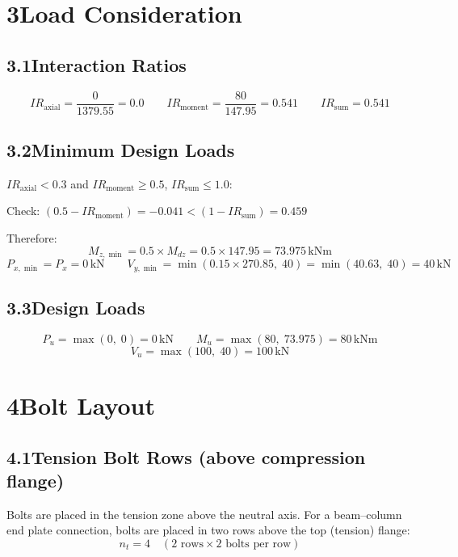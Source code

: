 \documentclass[12pt,a4paper]{article}
\newcommand{\kN}{\,\text{kN}}
\newcommand{\kNm}{\,\text{kNm}}
\begin{document}
\section{3\quad Load Consideration}

\subsection{3.1\quad Interaction Ratios}
\[
  IR_{\text{axial}}  = \frac{0}{1379.55} = 0.0
  \qquad
  IR_{\text{moment}} = \frac{80}{147.95} = 0.541
  \qquad
  IR_{\text{sum}} = 0.541
\]

\subsection{3.2\quad Minimum Design Loads}
$IR_{\text{axial}} < 0.3$ and $IR_{\text{moment}} \geq 0.5$, $IR_{\text{sum}} \leq 1.0$:

Check: $(0.5 - IR_{\text{moment}}) = -0.041 < (1 - IR_{\text{sum}}) = 0.459$

Therefore:
\[
  M_{z,\min} = 0.5\times M_{dz} = 0.5\times 147.95 = 73.975\kNm
\]
\[
  P_{x,\min} = P_x = 0\kN
  \qquad
  V_{y,\min} = \min(0.15\times 270.85,\;40) = \min(40.63,\;40) = 40\kN
\]

\subsection{3.3\quad Design Loads}
\[
  P_u = \max(0,\;0) = \boxed{0\kN}
  \qquad
  M_u = \max(80,\;73.975) = \boxed{80\kNm}
\]
\[
  V_u = \max(100,\;40) = \boxed{100\kN}
\]

\section{4\quad Bolt Layout}

\subsection{4.1\quad Tension Bolt Rows (above compression flange)}
Bolts are placed in the tension zone above the neutral axis. For a beam–column end plate connection, bolts are placed in two rows above the top (tension) flange:
\[
  n_t = 4 \quad (\text{2 rows} \times \text{2 bolts per row})
\]
\end{document}
